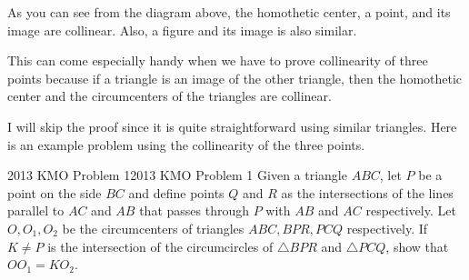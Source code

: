 \documentclass[../../../main.tex]{subfiles}
\begin{document}
As you can see from the diagram above, the homothetic center,
a point, and its image are collinear. Also, a figure and its
image is also similar.

\begin{important}
This can come especially handy when we have to prove collinearity of
three points because if a triangle is an image of the other triangle,
then the homothetic center and the circumcenters of the triangles are
collinear.
\end{important}

I will skip the proof since it is quite straightforward using similar
triangles. Here is an example problem using the collinearity of the
three points.

\begin{problem}{2013 KMO Problem 1}{2013 KMO Problem 1}
Given a triangle $ABC$, let $P$ be a point on the side $BC$ and define
points $Q$ and $R$ as the intersections of the lines parallel to $AC$
and $AB$ that passes through $P$ with $AB$ and $AC$ respectively.
Let $O, O_1, O_2$ be the circumcenters of triangles $ABC, BPR, PCQ$
respectively. If $K \neq P$ is the intersection of the circumcircles
of $\triangle{BPR}$ and $\triangle{PCQ}$, show that $OO_1 = KO_2$.
\end{problem}
\end{document}

